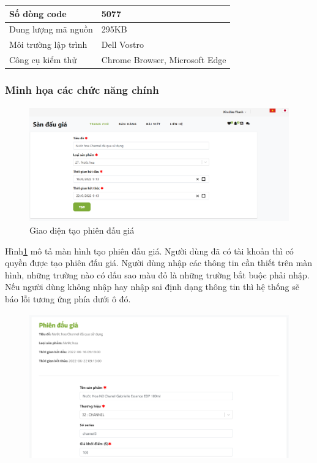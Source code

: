 \documentclass{article}
\begin{document}
    \tabletail{\hline}
    \label{bang412}
    \begin{supertabular}{| p{.45\textwidth}| p{.45\textwidth} |} 
    \hline
        Số dòng code& 5077\\\hline
        Dung lượng mã nguồn&295KB \\\hline
        Môi trường lập trình&Dell Vostro \\\hline
        Công cụ kiểm thử & Chrome Browser, Microsoft Edge\\\hline
    \end{supertabular}
\subsubsection{Minh họa các chức năng chính}
\begin{figure}[H]
    \centering
    \includegraphics[width=11.4cm,height=4.95cm]{images/createauctiondemo.png}
    \caption{Giao diện tạo phiên đấu giá}
    \label{hinh414}
\end{figure}
Hình\ref{hinh414} mô tả màn hình tạo phiên đấu giá. Người dùng đã có tài khoản thì có quyền được tạo phiên đấu giá. Người dùng nhập các thông tin cần thiết trên màn hình, những trường nào có dấu sao màu đỏ là những trường bắt buộc phải nhập. Nếu người dùng không nhập hay nhập sai định dạng thông tin thì hệ thống sẽ báo lỗi tương ứng phía dưới ô đó. 
\begin{figure}[H]
    \centering
    \includegraphics[width=11.4cm,height=6.28cm]{images/createitem1demo.png}
    \label{hinh4151}
\end{figure}
\end{document}
